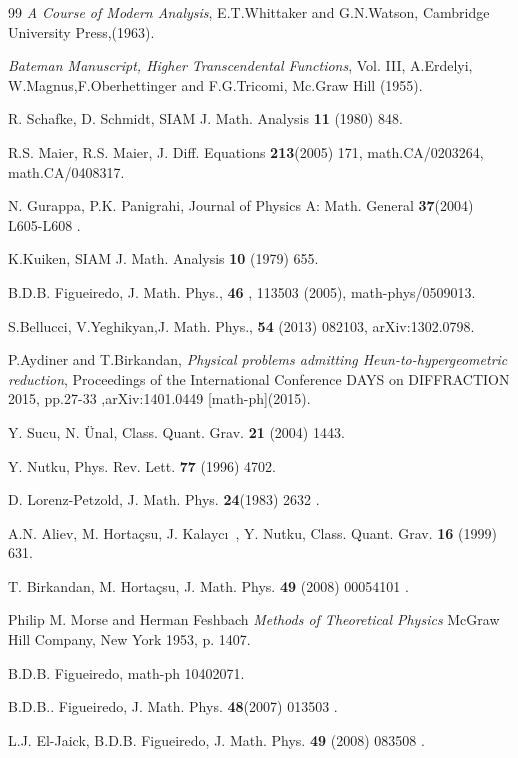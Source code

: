 \documentclass{article}
\begin{document}
\begin{thebibliography}{99}
  \emph{A Course of Modern Analysis},
 E.T.Whittaker and G.N.Watson, Cambridge University
 Press,(1963).

  \emph{Bateman Manuscript, Higher Transcendental Functions},
 Vol. III, A.Erdelyi, W.Magnus,F.Oberhettinger and F.G.Tricomi, Mc.Graw Hill (1955).

 R. Schafke, D. Schmidt, SIAM J. Math.
Analysis \textbf{11} (1980) 848.

 R.S. Maier, R.S.
Maier, J.  Diff. Equations \textbf{213}(2005) 171,
math.CA/0203264, math.CA/0408317.

 N. Gurappa, P.K. Panigrahi, Journal of Physics A: Math.
General \textbf{37}(2004) L605-L608 .

 K.Kuiken, SIAM J. Math. Analysis \textbf{10} (1979) 655.

 B.D.B. Figueiredo, J. Math. Phys., \textbf{46} , 113503
(2005), math-phys/0509013.

 S.Bellucci, V.Yeghikyan,J. Math. Phys., \textbf {54}  (2013) 082103, arXiv:1302.0798.

 P.Aydiner and T.Birkandan,
\emph{Physical problems admitting Heun-to-hypergeometric
reduction}, Proceedings of the International Conference DAYS on
DIFFRACTION 2015, pp.27-33   ,arXiv:1401.0449 [math-ph](2015).

 Y. Sucu, N. \"{U}nal, Class.  Quant. Grav. \textbf{21} (2004) 1443.

 Y. Nutku, Phys. Rev. Lett. \textbf{77} (1996) 4702.

 D. Lorenz-Petzold, J.  Math. Phys. \textbf{24}(1983)
2632 .

 A.N. Aliev, M. Horta\c{c}su, J. Kalayc\i\ , Y. Nutku,
Class. Quant.  Grav. \textbf{16} (1999) 631.

 T. Birkandan, M. Horta\c{c}su, J. Math.
Phys. \textbf{49} (2008) 00054101 .

 Philip M. Morse and Herman Feshbach \textit{
Methods of Theoretical Physics} McGraw Hill Company, New York
1953, p. 1407.

 B.D.B. Figueiredo, math-ph 10402071.

 B.D.B.. Figueiredo, J. Math. Phys. \textbf{48}(2007) 013503 .

 L.J. El-Jaick, B.D.B. Figueiredo, J. Math. Phys. \textbf{49} (2008) 083508 .


\end{thebibliography}
\end{document}
